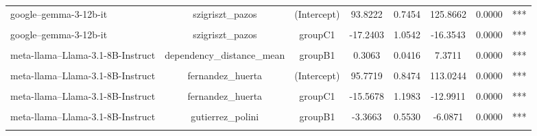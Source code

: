 \begin{table}[!h]
{\begin{tabular}{lccccccc}
google--gemma-3-12b-it & szigriszt_pazos & (Intercept) & 93.8222 & 0.7454 & 125.8662 & 0.0000 & ***\\
\cellcolor{gray!10}{google--gemma-3-12b-it} & \cellcolor{gray!10}{szigriszt_pazos} & \cellcolor{gray!10}{groupB1} & \cellcolor{gray!10}{-4.5200} & \cellcolor{gray!10}{1.0542} & \cellcolor{gray!10}{-4.2877} & \cellcolor{gray!10}{0.0000} & \cellcolor{gray!10}{***}\\
\addlinespace
google--gemma-3-12b-it & szigriszt_pazos & groupC1 & -17.2403 & 1.0542 & -16.3543 & 0.0000 & ***\\
\cellcolor{gray!10}{meta-llama--Llama-3.1-8B-Instruct} & \cellcolor{gray!10}{dependency_distance_mean} & \cellcolor{gray!10}{(Intercept)} & \cellcolor{gray!10}{2.2618} & \cellcolor{gray!10}{0.0294} & \cellcolor{gray!10}{76.9691} & \cellcolor{gray!10}{0.0000} & \cellcolor{gray!10}{***}\\
meta-llama--Llama-3.1-8B-Instruct & dependency_distance_mean & groupB1 & 0.3063 & 0.0416 & 7.3711 & 0.0000 & ***\\
\cellcolor{gray!10}{meta-llama--Llama-3.1-8B-Instruct} & \cellcolor{gray!10}{dependency_distance_mean} & \cellcolor{gray!10}{groupC1} & \cellcolor{gray!10}{0.3763} & \cellcolor{gray!10}{0.0416} & \cellcolor{gray!10}{9.0548} & \cellcolor{gray!10}{0.0000} & \cellcolor{gray!10}{***}\\
meta-llama--Llama-3.1-8B-Instruct & fernandez_huerta & (Intercept) & 95.7719 & 0.8474 & 113.0244 & 0.0000 & ***\\
\addlinespace
\cellcolor{gray!10}{meta-llama--Llama-3.1-8B-Instruct} & \cellcolor{gray!10}{fernandez_huerta} & \cellcolor{gray!10}{groupB1} & \cellcolor{gray!10}{-7.6024} & \cellcolor{gray!10}{1.1983} & \cellcolor{gray!10}{-6.3441} & \cellcolor{gray!10}{0.0000} & \cellcolor{gray!10}{***}\\
meta-llama--Llama-3.1-8B-Instruct & fernandez_huerta & groupC1 & -15.5678 & 1.1983 & -12.9911 & 0.0000 & ***\\
\cellcolor{gray!10}{meta-llama--Llama-3.1-8B-Instruct} & \cellcolor{gray!10}{gutierrez_polini} & \cellcolor{gray!10}{(Intercept)} & \cellcolor{gray!10}{46.1233} & \cellcolor{gray!10}{0.3910} & \cellcolor{gray!10}{117.9475} & \cellcolor{gray!10}{0.0000} & \cellcolor{gray!10}{***}\\
meta-llama--Llama-3.1-8B-Instruct & gutierrez_polini & groupB1 & -3.3663 & 0.5530 & -6.0871 & 0.0000 & ***\\
\cellcolor{gray!10}{meta-llama--Llama-3.1-8B-Instruct} & \cellcolor{gray!10}{gutierrez_polini} & \cellcolor{gray!10}{groupC1} & \cellcolor{gray!10}{-7.0727} & \cellcolor{gray!10}{0.5530} & \cellcolor{gray!10}{-12.7891} & \cellcolor{gray!10}{0.0000} & \cellcolor{gray!10}{***}\\

\end{tabular}}
\end{table}
